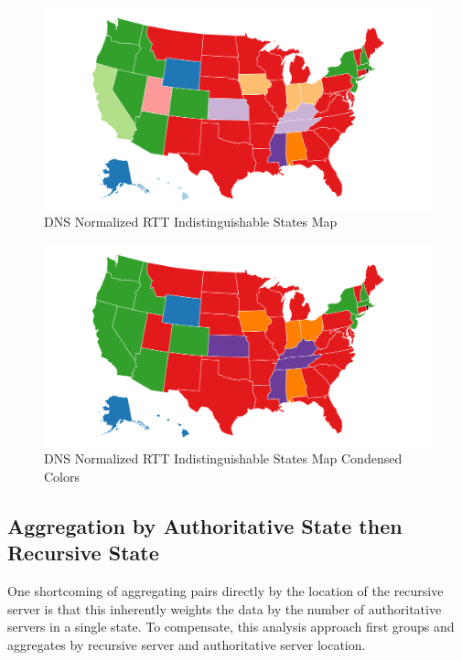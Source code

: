 \begin{figure}[H]
    \centering
    \includegraphics[width=\textwidth]{images/dns/analysis_no_auth_agg/rtt_normalized/no_auth_distinct_norm_rtt_map.png}
    \caption{DNS Normalized RTT Indistinguishable States Map}
    \label{fig:dns_normalized_rtt_indistinguishable_states_map}
\end{figure}

\begin{figure}[H]
    \centering
    \includegraphics[width=\textwidth]{images/dns/analysis_no_auth_agg/rtt_normalized/no_auth_distinct_norm_rtt_map_condensed.png}
    \caption{DNS Normalized RTT Indistinguishable States Map Condensed Colors}
    \label{fig:dns_normalized_rtt_indistinguishable_states_map_condensed_colors}
\end{figure}



\subsection{Aggregation by Authoritative State then Recursive State}

One shortcoming of aggregating pairs directly by the location of the recursive server is that this inherently weights the data by the number of authoritative servers in a single state. To compensate, this analysis approach first groups and aggregates by recursive server and authoritative server location. 

